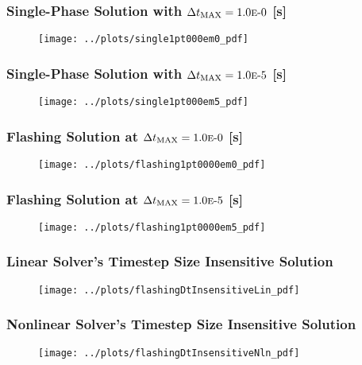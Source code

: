 \documentclass[compress,xcolor=table]{beamer}
\begin{document}
\begin{frame}
\frametitle{Single-Phase Solution with $\dtmax{} = \expneg{1.0}{0}$ [s]}

\begin{figure}[h!t]
\centering
\texttt{[image: ../plots/single1pt000em0\_pdf]}
\end{figure}

\end{frame}
\begin{frame}
\frametitle{Single-Phase Solution with $\dtmax{} = \expneg{1.0}{5}$ [s]}

\begin{figure}[h!t]
\centering
\texttt{[image: ../plots/single1pt000em5\_pdf]}
\end{figure}

\end{frame}
\begin{frame}
\frametitle{Flashing Solution at $\dtmax{} = \expneg{1.0}{0}$ [s]}

\begin{figure}[h!t]
\centering
\texttt{[image: ../plots/flashing1pt0000em0\_pdf]}
\end{figure}

\end{frame}
\begin{frame}
\frametitle{Flashing Solution at $\dtmax{} = \expneg{1.0}{5}$ [s]}

\begin{figure}[h!t]
\centering
\texttt{[image: ../plots/flashing1pt0000em5\_pdf]}
\end{figure}

\end{frame}
\begin{frame}
\frametitle{Linear Solver's Timestep Size Insensitive Solution}

\begin{figure}[h!t]
\centering
\texttt{[image: ../plots/flashingDtInsensitiveLin\_pdf]}
\end{figure}

\end{frame}
\begin{frame}
\frametitle{Nonlinear Solver's Timestep Size Insensitive Solution}

\begin{figure}[h!t]
\centering
\texttt{[image: ../plots/flashingDtInsensitiveNln\_pdf]}
\end{figure}

\end{frame}
\end{document}
